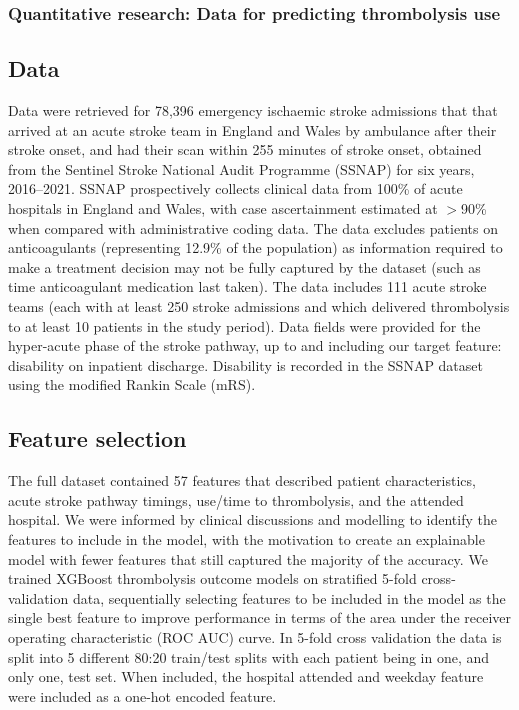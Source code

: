 \subsubsection{Quantitative research: Data for predicting thrombolysis use}

\renewcommand{\thefootnote}{\alph{footnote}}

\subsection{Data}

Data were retrieved for 78,396 emergency ischaemic stroke admissions that that arrived at an acute stroke team in England and Wales by ambulance after their stroke onset, and had their scan within 255 minutes of stroke onset, obtained from the Sentinel Stroke National Audit Programme (SSNAP) for six years, 2016–2021. SSNAP prospectively collects clinical data from 100\% of acute hospitals in England and Wales, with case ascertainment estimated at $>$90\% when compared with administrative coding data. The data excludes patients on anticoagulants (representing 12.9\% of the population) as information required to make a treatment decision may not be fully captured by the dataset (such as time anticoagulant medication last taken). The data includes 111 acute stroke teams (each with at least 250 stroke admissions  and which delivered thrombolysis to at least 10 patients in the study period). Data fields were provided for the hyper-acute phase of the stroke pathway, up to and including our target feature: disability on inpatient discharge. Disability is recorded in the SSNAP dataset using the modified Rankin Scale (mRS).


\subsection{Feature selection}

The full dataset contained 57 features that described patient characteristics, acute stroke pathway timings, use/time to thrombolysis, and the attended hospital. We were informed by clinical discussions and modelling to identify the features to include in the model, with the motivation to create an explainable model with fewer features that still captured the majority of the accuracy. We trained XGBoost thrombolysis outcome models on stratified 5-fold cross-validation data, sequentially selecting features to be included in the model as the single best feature to improve performance in terms of the area under the receiver operating characteristic (ROC AUC) curve. In 5-fold cross validation the data is split into 5 different 80:20 train/test splits with each patient being in one, and only one, test set. When included, the hospital attended and weekday feature were included as a one-hot encoded feature.

